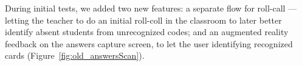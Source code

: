 During initial tests, we added two new features: a separate flow for roll-call  --- letting the teacher to do an initial roll-coll in the classroom to later better identify absent students from unrecognized codes; and an augmented reality feedback on the answers capture screen, to let the user identifying recognized cards (Figure~\ref{fig:old_answersScan}).








